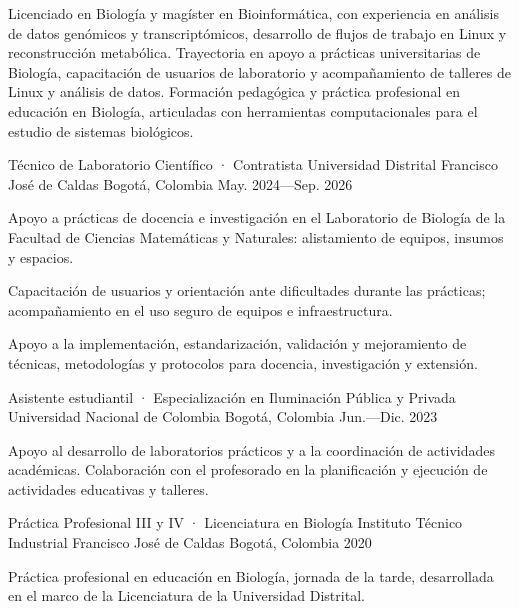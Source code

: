 \documentclass[11pt,letterpaper]{awesome-cv}
\renewenvironment{cvparagraph}{\par\vspace{2mm}\paragraphstyle}{\par\vspace{2mm}}
\begin{document}
\makecvheader

\begin{cvparagraph}
Licenciado en Biología y magíster en Bioinformática, con experiencia en análisis de datos genómicos y transcriptómicos, desarrollo de flujos de trabajo en Linux y reconstrucción metabólica. Trayectoria en apoyo a prácticas universitarias de Biología, capacitación de usuarios de laboratorio y acompañamiento de talleres de Linux y análisis de datos. Formación pedagógica y práctica profesional en educación en Biología, articuladas con herramientas computacionales para el estudio de sistemas biológicos.
\end{cvparagraph}



\begin{cventries}
\cventry
{Técnico de Laboratorio Científico · Contratista}
{Universidad Distrital Francisco José de Caldas}
{Bogotá, Colombia}
{May. 2024---Sep. 2026}
{\begin{cvitems}
\item {Apoyo a prácticas de docencia e investigación en el Laboratorio de Biología de la Facultad de Ciencias Matemáticas y Naturales: alistamiento de equipos, insumos y espacios.}
\item {Capacitación de usuarios y orientación ante dificultades durante las prácticas; acompañamiento en el uso seguro de equipos e infraestructura.}
\item {Apoyo a la implementación, estandarización, validación y mejoramiento de técnicas, metodologías y protocolos para docencia, investigación y extensión.}
\end{cvitems}}

\cventry
{Asistente estudiantil · Especialización en Iluminación Pública y Privada}
{Universidad Nacional de Colombia}
{Bogotá, Colombia}
{Jun.---Dic. 2023}
{\begin{cvitems}
\item {Apoyo al desarrollo de laboratorios prácticos y a la coordinación de actividades académicas. Colaboración con el profesorado en la planificación y ejecución de actividades educativas y talleres.}
\end{cvitems}}

\cventry
{Práctica Profesional III y IV · Licenciatura en Biología}
{Instituto Técnico Industrial Francisco José de Caldas}
{Bogotá, Colombia}
{2020}
{\begin{cvitems}
\item {Práctica profesional en educación en Biología, jornada de la tarde, desarrollada en el marco de la Licenciatura de la Universidad Distrital.}
\end{cvitems}}
\end{cventries}
\end{document}
